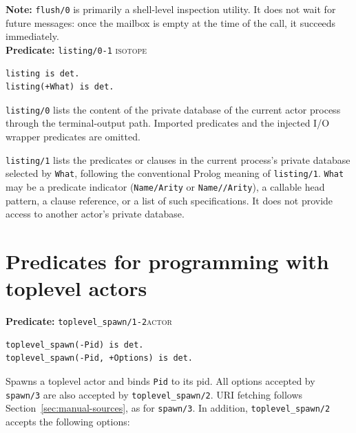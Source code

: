 \medskip
\noindent \textbf{Note:}
\texttt{flush/\allowbreak{}0} is primarily a shell-level inspection utility. It does
not wait for future messages: once the mailbox is empty at the time of the
call, it succeeds immediately.\\



\noindent \textbf{Predicate:} \texttt{listing/\allowbreak{}0-1}
\hfill\textsc{isotope}

\begin{verbatim}
listing is det.
listing(+What) is det.
\end{verbatim}

\noindent \texttt{listing/\allowbreak{}0} lists the content of the private database of the
current actor process through the terminal-output path. Imported predicates
and the injected I/O wrapper predicates are omitted.

\texttt{listing/\allowbreak{}1} lists the predicates or clauses in the current process's
private database selected by \texttt{What}, following the conventional
Prolog meaning of \texttt{listing/\allowbreak{}1}. \texttt{What} may be a predicate
indicator (\texttt{Name/\allowbreak{}Arity} or \texttt{Name/\allowbreak{}/\allowbreak{}Arity}), a callable head
pattern, a clause reference, or a list of such specifications. It does not
provide access to another actor's private database.\\

\section{Predicates for programming with toplevel actors}\label{sec:toplevel-api}


\noindent \textbf{Predicate:} \texttt{toplevel\_\allowbreak{}spawn/\allowbreak{}1-2}\hfill\textsc{actor}

\begin{verbatim}
toplevel_spawn(-Pid) is det.
toplevel_spawn(-Pid, +Options) is det.
\end{verbatim}

\noindent Spawns a toplevel actor and binds \texttt{Pid} to its pid. All options accepted by \texttt{spawn/\allowbreak{}3} are also accepted by
\texttt{toplevel\_\allowbreak{}spawn/\allowbreak{}2}. URI fetching follows Section~\ref{sec:manual-sources},
as for \texttt{spawn/\allowbreak{}3}. In addition, \texttt{toplevel\_\allowbreak{}spawn/\allowbreak{}2}
accepts the following options:

